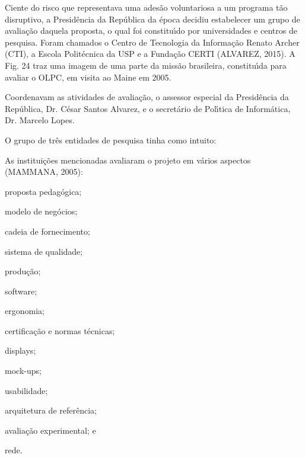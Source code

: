 \documentclass[
12pt,		%
openright,	%
twoside,  %
a4paper,			%
chapter=TITLE,		%
english,			%
french,				%
spanish,			%
brazil				%
]{USPSC-classe/USPSC}
\begin{document}
Ciente do risco que representava uma ades\~ao voluntariosa a um programa t\~ao disruptivo, a Presid\^encia da Rep\'ublica da \'epoca decidiu estabelecer um grupo de avalia\c{c}\~ao  daquela proposta, o  qual foi constitu\'{\i}do por universidades e centros de pesquisa. Foram chamados o Centro de Tecnologia da Informa\c{c}\~ao Renato Archer (CTI), a Escola Polit\'ecnica da USP e a Funda\c{c}\~ao CERTI (ALVAREZ, 2015). A Fig. 24 traz uma imagem de uma parte da miss\~ao brasileira, constitu\'{\i}da para avaliar o OLPC, em visita ao Maine em 2005.









Coordenavam as atividades de avalia\c{c}\~ao, o assessor especial da Presid\^encia da Rep\'ublica, Dr. C\'esar Santos Alvarez, e o secret\'ario de Pol\'{\i}tica de Inform\'atica, Dr. Marcelo Lopes.









O grupo de tr\^es entidades de pesquisa tinha como intuito:










\noindent\begin{center}\mbox{\centering{}}\end{center}


As institui\c{c}\~oes mencionadas avaliaram o projeto em v\'arios aspectos  (MAMMANA, 2005):










\begin{alineas}
\item proposta pedag\'ogica;
\item modelo de neg\'ocios;
\item cadeia de fornecimento;
\item sistema de qualidade;
\item produ\c{c}\~ao;
\item software;
\item ergonomia;
\item certifica\c{c}\~ao e normas t\'ecnicas;
\item displays;
\item mock-ups;
\item usabilidade;
\item arquitetura de refer\^encia;
\item avalia\c{c}\~ao experimental; e
\item rede.
\end{alineas}
\end{document}
